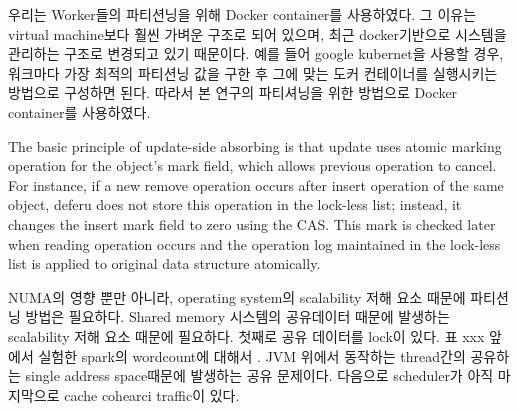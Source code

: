 \ifkor
우리는 Worker들의 파티션닝을 위해 Docker container를 사용하였다. 
그 이유는 virtual machine보다 훨씬 가벼운 구조로 되어 있으며, 
최근 docker기반으로 시스템을 관리하는 구조로 변경되고 있기 때문이다.
예를 들어 google kubernet을 사용할 경우, 워크마다 가장 최적의 파티션닝 값을 구한 후
그에 맞는 도커 컨테이너를 실행시키는 방법으로 구성하면 된다.
따라서 본 연구의 파티셔닝을 위한 방법으로 Docker container를 사용하였다.
\else

\fi


The basic principle of update-side absorbing is that update uses atomic 
marking operation for the object's mark field, which allows previous operation to cancel.
For instance, if a new remove operation occurs after insert operation of the
same object, deferu does not store this operation in the lock-less
list; instead, it changes the insert mark field to zero using the CAS.
This mark is checked later when reading operation occurs and the operation log 
maintained in the lock-less list is applied to original data structure atomically.




\ifkor
NUMA의 영향 뿐만 아니라, operating system의 scalability 저해 요소 때문에 파티션닝 방법은 필요하다.
Shared memory 시스템의 공유데이터 때문에 발생하는 scalability 저해 요소 때문에 필요하다.
첫째로 공유 데이터를 lock이 있다. 표 xxx 앞에서 실험한 spark의 wordcount에 대해서 .
JVM 위에서 동작하는 thread간의 공유하는 single address space때문에 발생하는 공유 문제이다.
다음으로 scheduler가 아직 
마지막으로 cache cohearci traffic이 있다. 

\else

\fi


